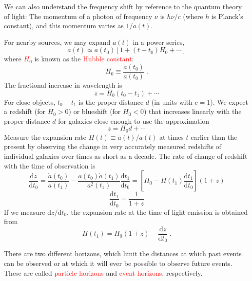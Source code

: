 \documentclass[12pt,a4paper]{article}
\newcommand{\dif}{\mathrm{d}}
\newcounter{theo}[section]\setcounter{theo}{0}
\begin{document}
We can also understand the frequency shift by reference to the quantum theory of light: The momentum of a photon of frequency $\nu$ is $h\nu/c$ (where $h$ is Planck's constant), and this momentum varies as $1/a(t)$. 

For nearby sources, we may expand $a(t)$ in a power series, 
\begin{equation}
a(t) \simeq a(t_0) [1+(t-t_0) H_0 + \cdots ]
\end{equation}
where \textcolor{red}{$H_0$} is known as the \textcolor{red}{Hubble constant}:
\begin{equation}
H_0 \equiv \dfrac{\dot{a}(t_0) }{a(t_0)} ~.
\end{equation}
The fractional increase in wavelength is
\begin{equation}
z = H_0 (t_0 - t_1) +\cdots
\end{equation}
For close objects, $t_0 - t_1$ is the proper distance $d$ (in units with $c = 1$). We expect a redshift (for $H_0 > 0$) or blueshift (for $H_0 < 0$) that increases linearly with the proper distance $d$ for galaxies close enough to use the approximation 
\begin{equation}
z = H_0 d + \cdots 
\end{equation}
Measure the expansion rate $H(t) \equiv \dot{a}(t)/a(t)$ at times $t$ earlier than the present by observing the change in very accurately measured redshifts of individual galaxies over times as short as
a decade. The rate of change of redshift with the time of observation is
\begin{equation}
\dfrac{\dif z}{\dif t_0} = \dfrac{\dot{a}(t_0) }{a(t_1)} - \dfrac{a(t_0) \dot{a}(t_1)}{a^2(t_1)} \dfrac{\dif t_1 }{\dif t_0} =  \left[H_0 - H(t_1) \dfrac{\dif t_1 }{\dif t_0} \right] (1+z)
\end{equation}
\begin{equation}
\dfrac{\dif t_1 }{\dif t_0} = \dfrac{1}{1+z}
\end{equation}
If we measure $\dif z/\dif t_0$, the expansion rate at the time of light emission is obtained from
\begin{equation}
H(t_1) = H_0(1+z) -\dfrac{\dif z}{\dif t_0} ~.
\end{equation}






There are two different horizons, which limit the distances at which past events can be observed or at which it will ever be possible to observe future events. These are called \textcolor{red}{particle horizons} and \textcolor{red}{event horizons}, respectively. 
\end{document}

